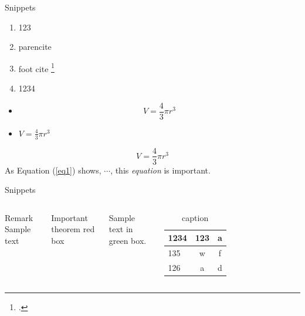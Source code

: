 \documentclass[UTF8, 16pt]{beamer}
\begin{document}
\begin{CJK*}{UTF8}{gbsn}

	\begin{frame}{Snippets}
		\begin{multicols}{2}
			\begin{enumerate}
				\item 123~\cite[Page10]{barro}
				\item parencite \\ \parencite{Greiner}
				\item foot cite \footcite{green}
				\item 1234~\cite{Greiner}
			\end{enumerate}
			\begin{itemize}
				\item \[V = \frac{4}{3}\pi r^3\]
				\item $ V = \frac{4}{3}\pi r^3 $
			\end{itemize}
		\end{multicols}
		\begin{equation}
			\label{eq1}
			V = \frac{4}{3}\pi r^3
		\end{equation}
		\center{}
		As Equation (\ref{eq1}) \textcolor{sufered}{shows},
		$\cdots$, this \emph{equation} is \alert{important}.
	\end{frame}

	\begin{frame}{Snippets}
		\begin{columns}
			\begin{block}{Remark}
				Sample text
			\end{block}
			\begin{alertblock}{Important theorem}
				red box
			\end{alertblock}
			\begin{examples}
				Sample text in green box.
			\end{examples}
			\begin{table}
				\centering
				\caption{caption}
				\setlength{\tabcolsep}{5mm}
				{
					\begin{tabular}{lcc}
						\toprule %
						1234                     & 123          & a   \\ \midrule
						\textcolor{deepred}{135} & w            & f   \\
						\textcolor{sufered}{126} & \alert{a} & d \\ \bottomrule
					\end{tabular}
				}
			\end{table}
		\end{columns}
	\end{frame}
\end{CJK*}
\end{document}
